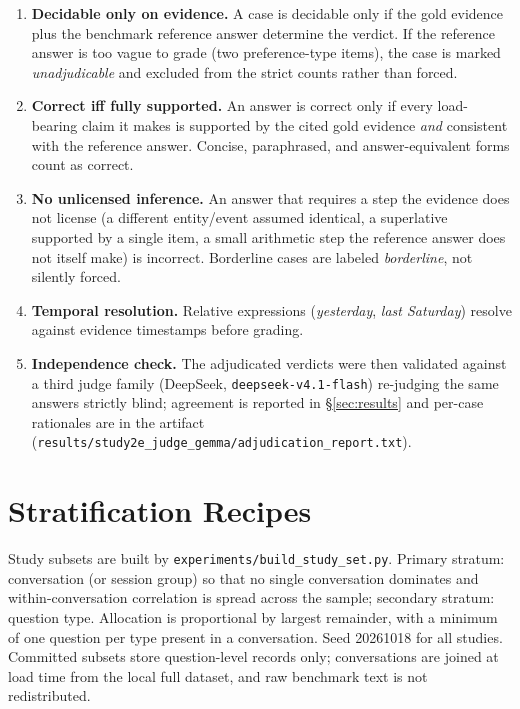 \documentclass[11pt]{article}
\begin{document}
\begin{enumerate}
\item \textbf{Decidable only on evidence.} A case is decidable only if
the gold evidence plus the benchmark reference answer determine the
verdict. If the reference answer is too vague to grade (two
preference-type items), the case is marked \emph{unadjudicable} and
excluded from the strict counts rather than forced.
\item \textbf{Correct iff fully supported.} An answer is correct only if
every load-bearing claim it makes is supported by the cited gold
evidence \emph{and} consistent with the reference answer. Concise,
paraphrased, and answer-equivalent forms count as correct.
\item \textbf{No unlicensed inference.} An answer that requires a step
the evidence does not license (a different entity/event assumed
identical, a superlative supported by a single item, a small arithmetic
step the reference answer does not itself make) is incorrect. Borderline
cases are labeled \emph{borderline}, not silently forced.
\item \textbf{Temporal resolution.} Relative expressions
(\emph{yesterday}, \emph{last Saturday}) resolve against evidence
timestamps before grading.
\item \textbf{Independence check.} The adjudicated verdicts were then
validated against a third judge family (DeepSeek,
\texttt{deepseek-v4.1-flash}) re-judging the same answers strictly
blind; agreement is reported in \S\ref{sec:results} and per-case
rationales are in the artifact
(\texttt{results/study2e\_judge\_gemma/adjudication\_report.txt}).
\end{enumerate}

\section{Stratification Recipes}
\label{app:stratification}

Study subsets are built by \texttt{experiments/build\_study\_set.py}.
Primary stratum: conversation (or session group) so that no single
conversation dominates and within-conversation correlation is spread
across the sample; secondary stratum: question type. Allocation is
proportional by largest remainder, with a minimum of one question per
type present in a conversation. Seed 20261018 for all studies. Committed
subsets store question-level records only; conversations are joined at
load time from the local full dataset, and raw benchmark text is not
redistributed.
\end{document}
